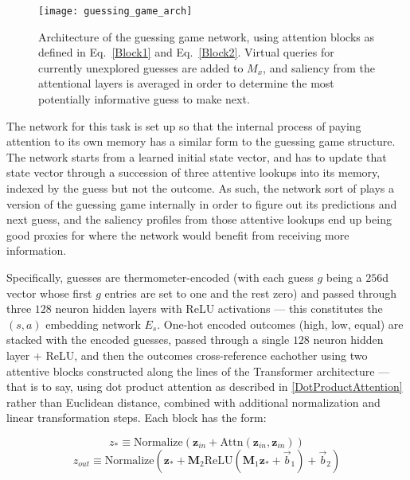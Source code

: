 \documentclass[letterpaper]{article}
\begin{document}
\begin{figure}
 \texttt{[image: guessing\_game\_arch]}
 \caption{\label{GuessingArchitecture} Architecture of the guessing game network, using attention blocks as defined in Eq.~\ref{Block1} and Eq.~\ref{Block2}. Virtual queries for currently unexplored guesses are added to $M_x$, and saliency from the attentional layers is averaged in order to determine the most potentially informative guess to make next. }
\end{figure}

The network for this task is set up so that the internal process of paying attention to its own memory has a similar form to the guessing game structure. The network starts from a learned initial state vector, and has to update that state vector through a succession of three attentive lookups into its memory, indexed by the guess but not the outcome. As such, the network sort of plays a version of the guessing game internally in order to figure out its predictions and next guess, and the saliency profiles from those attentive lookups end up being good proxies for where the network would benefit from receiving more information.

Specifically, guesses are thermometer-encoded \citep{fiete2007neural} (with each guess $g$ being a $256$d vector whose first $g$ entries are set to one and the rest zero) and passed through three $128$ neuron hidden layers with ReLU activations --- this constitutes the $(s,a)$ embedding network $E_s$. One-hot encoded outcomes (high, low, equal) are stacked with the encoded guesses, passed through a single $128$ neuron hidden layer + ReLU, and then the outcomes cross-reference eachother using two attentive blocks constructed along the lines of the Transformer architecture \citep{vaswani2017attention} --- that is to say, using dot product attention as described in \ref{DotProductAttention} rather than Euclidean distance, combined with additional normalization and linear transformation steps. Each block has the form:

\begin{equation}
z_* \equiv \textrm{Normalize}( \textbf{z}_{in} + \textrm{Attn}(\textbf{z}_{in}, \textbf{z}_{in}) )
\label{Block1}
\end{equation}
\begin{equation}
z_{out} \equiv \textrm{Normalize}( \textbf{z}_* + \textbf{M}_2 \textrm{ReLU}(\textbf{M}_1 \textbf{z}_* + \vec{b}_1) + \vec{b}_2 )
\label{Block2}
\end{equation}
\end{document}
